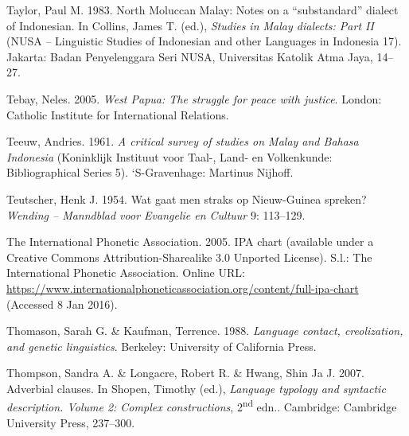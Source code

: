 \begin{styleCitaviBibliographyEntry}
Taylor, Paul M. 1983. North Moluccan Malay: Notes on a “substandard” dialect of Indonesian. In Collins, James T. (ed.), \textit{Studies in Malay dialects: Part II} (NUSA – Linguistic Studies of Indonesian and other Languages in Indonesia 17). Jakarta: Badan Penyelenggara Seri NUSA, Universitas Katolik Atma Jaya, 14–27.
\end{styleCitaviBibliographyEntry}

\begin{styleCitaviBibliographyEntry}
Tebay, Neles. 2005. \textit{West Papua: The struggle for peace with justice}. London: Catholic Institute for International Relations.
\end{styleCitaviBibliographyEntry}

\begin{styleCitaviBibliographyEntry}
Teeuw, Andries. 1961. \textit{A critical survey of studies on Malay and Bahasa Indonesia} (Koninklijk Instituut voor Taal-, Land- en Volkenkunde: Bibliographical Series 5). ‘S-Gravenhage: Martinus Nijhoff.
\end{styleCitaviBibliographyEntry}

\begin{styleCitaviBibliographyEntry}
Teutscher, Henk J. 1954. Wat gaat men straks op Nieuw-Guinea spreken? \textit{Wending – Manndblad voor Evangelie en Cultuur} 9: 113–129.
\end{styleCitaviBibliographyEntry}

\begin{styleCitaviBibliographyEntry}
The International Phonetic Association. 2005. IPA chart (available under a Creative Commons Attribution-Sharealike 3.0 Unported License). S.l.: The International Phonetic Association. Online URL: \url{https://www.internationalphoneticassociation.org/content/full-ipa-chart} (Accessed 8 Jan 2016).
\end{styleCitaviBibliographyEntry}

\begin{styleCitaviBibliographyEntry}
Thomason, Sarah G. \& Kaufman, Terrence. 1988. \textit{Language contact, creolization, and genetic linguistics}. Berkeley: University of California Press.
\end{styleCitaviBibliographyEntry}

\begin{styleCitaviBibliographyEntry}
Thompson, Sandra A. \& Longacre, Robert R. \& Hwang, Shin Ja J. 2007. Adverbial clauses. In Shopen, Timothy (ed.), \textit{Language typology and syntactic description. Volume 2: Complex constructions}, 2\textsuperscript{nd} edn.. Cambridge: Cambridge University Press, 237–300.
\end{styleCitaviBibliographyEntry}


